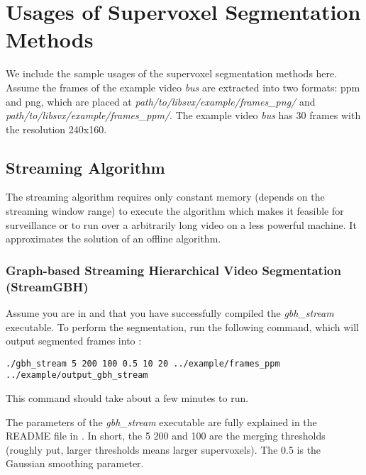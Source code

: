 \documentclass{article}
\begin{document}
\section{Usages of Supervoxel Segmentation Methods}
We include the sample usages of the supervoxel segmentation methods here. Assume the frames of the example video \textit{bus} are extracted into two formats: ppm and png, which are placed at \textit{path\slash to\slash libsvx\slash example\slash frames\_png\slash} and \textit{path\slash to\slash libsvx\slash example\slash frames\_ppm\slash }. The example video \textit{bus} has 30 frames with the resolution 240x160.

\subsection{Streaming Algorithm}
\label{sec:stream}
The streaming algorithm requires only constant memory (depends on the streaming window range) to execute the algorithm which makes it feasible for surveillance or to run over a arbitrarily long video on a less powerful machine. It approximates the solution of an offline algorithm.

\subsubsection{Graph-based Streaming Hierarchical Video Segmentation (StreamGBH)}
\label{sec:streamgbh}
Assume you are in  and that you have successfully compiled the \textit{gbh\_stream} executable. To perform the segmentation, run the following command, which will output segmented frames into : 

\begin{verbatim}
./gbh_stream 5 200 100 0.5 10 20 ../example/frames_ppm ../example/output_gbh_stream
\end{verbatim}

This command should take about a few minutes to run.

The parameters of the \textit{gbh\_stream} executable are fully explained in the README file in .  In short, the 5 200 and 100 are the merging thresholds (roughly put, larger thresholds means larger supervoxels). The 0.5 is the Gaussian smoothing parameter. 
\end{document}
